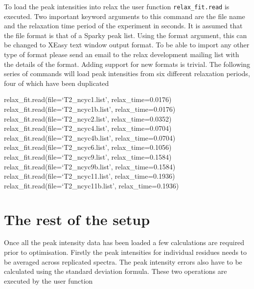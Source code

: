 
To load the peak intensities into relax the user function \texttt{relax\_fit.read} is executed.  Two important keyword arguments to this command are the file name and the relaxation time period of the experiment in seconds.  It is assumed that the file format is that of a Sparky peak list.  Using the format argument, this can be changed to XEasy text window output format.  To be able to import any other type of format please send an email to the relax development mailing list with the details of the format.  Adding support for new formats is trivial.  The following series of commands will load peak intensities from six different relaxation periods, four of which have been duplicated

\begin{exampleenv}
relax\_fit.read(file=`T2\_ncyc1.list', relax\_time=0.0176) \\
relax\_fit.read(file=`T2\_ncyc1b.list', relax\_time=0.0176) \\
relax\_fit.read(file=`T2\_ncyc2.list', relax\_time=0.0352) \\
relax\_fit.read(file=`T2\_ncyc4.list', relax\_time=0.0704) \\
relax\_fit.read(file=`T2\_ncyc4b.list', relax\_time=0.0704) \\
relax\_fit.read(file=`T2\_ncyc6.list', relax\_time=0.1056) \\
relax\_fit.read(file=`T2\_ncyc9.list', relax\_time=0.1584) \\
relax\_fit.read(file=`T2\_ncyc9b.list', relax\_time=0.1584) \\
relax\_fit.read(file=`T2\_ncyc11.list', relax\_time=0.1936) \\
relax\_fit.read(file=`T2\_ncyc11b.list', relax\_time=0.1936)
\end{exampleenv}




\section{The rest of the setup}

Once all the peak intensity data has been loaded a few calculations are required prior to optimisation.  Firstly the peak intensities for individual residues needs to be averaged across replicated spectra.  The peak intensity errors also have to be calculated using the standard deviation formula.  These two operations are executed by the user function

